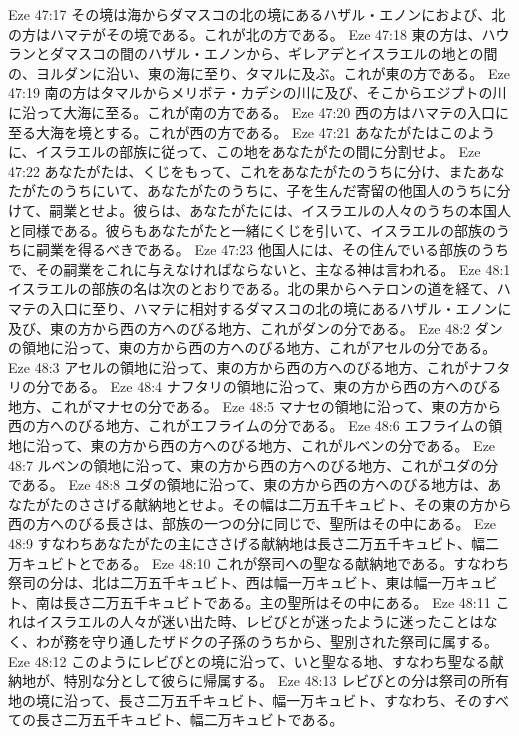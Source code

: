Eze 47:17  その境は海からダマスコの北の境にあるハザル・エノンにおよび、北の方はハマテがその境である。これが北の方である。
Eze 47:18  東の方は、ハウランとダマスコの間のハザル・エノンから、ギレアデとイスラエルの地との間の、ヨルダンに沿い、東の海に至り、タマルに及ぶ。これが東の方である。
Eze 47:19  南の方はタマルからメリボテ・カデシの川に及び、そこからエジプトの川に沿って大海に至る。これが南の方である。
Eze 47:20  西の方はハマテの入口に至る大海を境とする。これが西の方である。
Eze 47:21  あなたがたはこのように、イスラエルの部族に従って、この地をあなたがたの間に分割せよ。
Eze 47:22  あなたがたは、くじをもって、これをあなたがたのうちに分け、またあなたがたのうちにいて、あなたがたのうちに、子を生んだ寄留の他国人のうちに分けて、嗣業とせよ。彼らは、あなたがたには、イスラエルの人々のうちの本国人と同様である。彼らもあなたがたと一緒にくじを引いて、イスラエルの部族のうちに嗣業を得るべきである。
Eze 47:23  他国人には、その住んでいる部族のうちで、その嗣業をこれに与えなければならないと、主なる神は言われる。
Eze 48:1  イスラエルの部族の名は次のとおりである。北の果からヘテロンの道を経て、ハマテの入口に至り、ハマテに相対するダマスコの北の境にあるハザル・エノンに及び、東の方から西の方へのびる地方、これがダンの分である。
Eze 48:2  ダンの領地に沿って、東の方から西の方へのびる地方、これがアセルの分である。
Eze 48:3  アセルの領地に沿って、東の方から西の方へのびる地方、これがナフタリの分である。
Eze 48:4  ナフタリの領地に沿って、東の方から西の方へのびる地方、これがマナセの分である。
Eze 48:5  マナセの領地に沿って、東の方から西の方へのびる地方、これがエフライムの分である。
Eze 48:6  エフライムの領地に沿って、東の方から西の方へのびる地方、これがルベンの分である。
Eze 48:7  ルベンの領地に沿って、東の方から西の方へのびる地方、これがユダの分である。
Eze 48:8  ユダの領地に沿って、東の方から西の方へのびる地方は、あなたがたのささげる献納地とせよ。その幅は二万五千キュビト、その東の方から西の方へのびる長さは、部族の一つの分に同じで、聖所はその中にある。
Eze 48:9  すなわちあなたがたの主にささげる献納地は長さ二万五千キュビト、幅二万キュビトとである。
Eze 48:10  これが祭司への聖なる献納地である。すなわち祭司の分は、北は二万五千キュビト、西は幅一万キュビト、東は幅一万キュビト、南は長さ二万五千キュビトである。主の聖所はその中にある。
Eze 48:11  これはイスラエルの人々が迷い出た時、レビびとが迷ったように迷ったことはなく、わが務を守り通したザドクの子孫のうちから、聖別された祭司に属する。
Eze 48:12  このようにレビびとの境に沿って、いと聖なる地、すなわち聖なる献納地が、特別な分として彼らに帰属する。
Eze 48:13  レビびとの分は祭司の所有地の境に沿って、長さ二万五千キュビト、幅一万キュビト、すなわち、そのすべての長さ二万五千キュビト、幅二万キュビトである。
